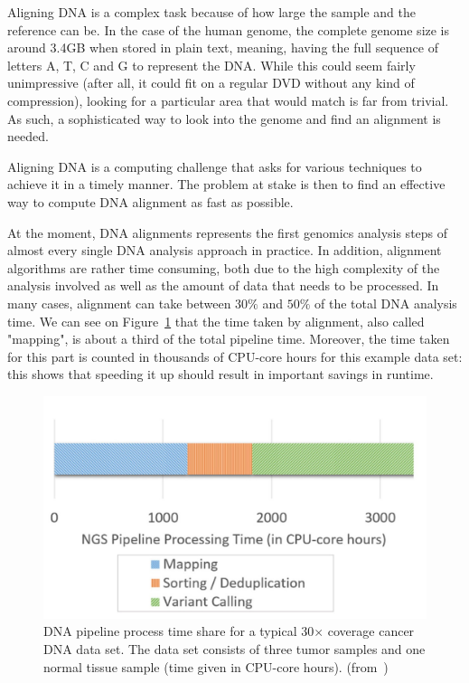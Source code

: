 Aligning DNA is a complex task because of how large the sample and the reference can be. In the case of the human genome, the complete genome size is around 3.4GB when stored in plain text, meaning, having the full sequence of letters A, T, C and G to represent the DNA. While this could seem fairly unimpressive (after all, it could fit on a regular DVD without any kind of compression), looking for a particular area that would match is far from trivial. As such, a sophisticated way to look into the genome and find an alignment is needed.

Aligning DNA is a computing challenge that asks for various techniques to achieve it in a timely manner. The problem at stake is then to find an effective way to compute DNA alignment as fast as possible.

At the moment, DNA alignments represents the first genomics analysis steps of almost every single DNA analysis approach in practice. In addition, alignment algorithms are rather time consuming, both due to the high complexity of the analysis involved as well as the amount of data that needs to be processed. In many cases, alignment can take between $30\%$ and $50\%$ of the total DNA analysis time. We can see on Figure~\ref{fig:pipelineprocesstime} that the time taken by alignment, also called "mapping", is about a third of the total pipeline time. Moreover, the time taken for this part is counted in thousands of CPU-core hours for this example data set: this shows that speeding it up should result in important savings in runtime.

\begin{figure}[h]
	\centering
	\includegraphics[width=1\linewidth]{pipelineprocesstime}
	\caption{DNA pipeline process time share for a typical 30$\times$ coverage cancer DNA data set. The data set consists of three tumor samples and one normal tissue sample (time given in CPU-core hours). (from~\cite{HOUTGAST201854})}
	\label{fig:pipelineprocesstime}
\end{figure}


